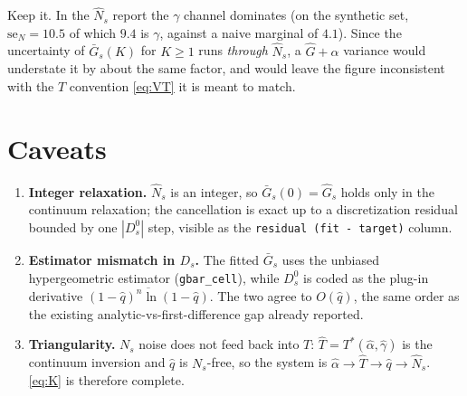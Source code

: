 \documentclass[11pt]{article}
\newcommand{\Gbar}{\bar{G}}
\newcommand{\Ghat}{\hat{G}}
\newcommand{\ahat}{\hat{\alpha}}
\newcommand{\ghat}{\hat{\gamma}}
\newcommand{\Nhat}{\hat{N}}
\newcommand{\qhat}{\hat{q}}
\begin{document}
Keep it. In the $\Nhat_s$ report the $\gamma$ channel dominates (on the synthetic set,
$\mathrm{se}_N=10.5$ of which $9.4$ is $\gamma$, against a naive marginal of $4.1$). Since the
uncertainty of $\Gbar_s(K)$ for $K\ge1$ runs \emph{through} $\Nhat_s$, a $\Ghat+\alpha$
variance would understate it by about the same factor, and would leave the figure
inconsistent with the $T$ convention \eqref{eq:VT} it is meant to match.

\section{Caveats}

\begin{enumerate}
\item \textbf{Integer relaxation.} $\Nhat_s$ is an integer, so $\Gbar_s(0)=\Ghat_s$ holds only
in the continuum relaxation; the cancellation is exact up to a discretization residual bounded
by one $|D_s^{0}|$ step, visible as the \texttt{residual (fit - target)} column.
\item \textbf{Estimator mismatch in $D_s$.} The fitted $\Gbar_s$ uses the unbiased
hypergeometric estimator (\texttt{gbar\_cell}), while $D_s^{0}$ is coded as the plug-in
derivative $\overline{(1-\qhat)^{n}\ln(1-\qhat)}$. The two agree to $O(\qhat)$, the same order
as the existing analytic-vs-first-difference gap already reported.
\item \textbf{Triangularity.} $N_s$ noise does not feed back into $T$: $\hat T=T^*(\ahat,\ghat)$
is the continuum inversion and $\qhat$ is $N_s$-free, so the system is
$\ahat\to\hat T\to\qhat\to\Nhat_s$. \eqref{eq:K} is therefore complete.
\end{enumerate}
\end{document}
